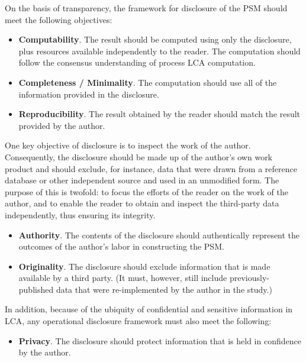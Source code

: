 On the basis of transparency, the framework for disclosure of the PSM should meet the following objectives:
\begin{itemize}
\item \textbf{Computability}. The result should be computed using only the disclosure, plus resources available independently to the reader.  The computation should follow the consensus understanding of process LCA computation.
\item \textbf{Completeness / Minimality}.  The computation should use all of the information provided in the disclosure.
\item \textbf{Reproducibility}.  The result obtained by the reader should match the result provided by the author.
\end{itemize}
One key objective of disclosure is to inspect the work of the author.  Consequently, the disclosure should be made up of the author's own work product and should exclude, for instance, data that were drawn from a reference database or other independent source and used in an unmodified form.  The purpose of this is twofold: to focus the efforts of the reader on the work of the author, and to enable the reader to obtain and inspect the third-party data independently, thus ensuring its integrity.
\begin{itemize}
\item \textbf{Authority}.  The contents of the disclosure should authentically represent the outcomes of the author's labor in constructing the PSM.
\item \textbf{Originality}.  The disclosure should exclude information that is made available by a third party.  (It must, however, still include previously-published data that were re-implemented by the author in the study.)
\end{itemize}
In addition, because of the ubiquity of confidential and sensitive information in LCA, any operational disclosure framework must also meet the following:
\begin{itemize}
\item \textbf{Privacy}.  The disclosure should protect information that is held in confidence by the author.
\end{itemize}

\endinput




